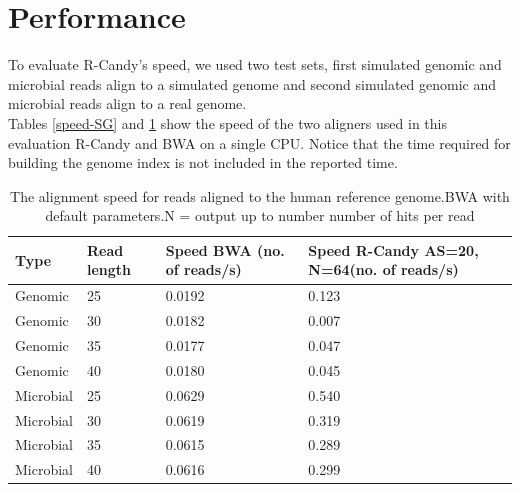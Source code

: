 \documentclass[11pt,a4paper]{report}
\begin{document}





\section{Performance}

To evaluate R-Candy's speed, we used two test sets, first simulated genomic 
and microbial reads align to a simulated genome and second simulated genomic
and microbial reads align to a real genome.\\

Tables  \ref{speed-SG} and \ref{speed-RG} show the speed of 
the two aligners used in this evaluation
R-Candy and BWA on a single CPU.
Notice that the time required for building the genome index is 
not included in the reported time.\\




\begin{table}[H]
  \begin{tabular}{ |  p{2cm} | p{2cm} | p{3cm} | p{3cm} | }
    \hline
  	\textbf{Type} & \textbf{Read length }&\textbf{Speed BWA \hspace{35pt}(no. of reads/s) } 	 
  	& \textbf{Speed R-Candy AS=20, N=64\hspace{35pt}(no. of reads/s)}\\ \hline
  	  
 	  Genomic    & 25  & 0.0192 &   0.123 \\ \hline
      Genomic    & 30  & 0.0182 &   0.007 \\ \hline
      Genomic    & 35  & 0.0177 &   0.047 \\ \hline
 	  Genomic	 & 40  & 0.0180 &   0.045 \\ \hline
 	  Microbial  & 25  & 0.0629 &   0.540 \\ \hline
      Microbial  & 30  & 0.0619 &   0.319 \\ \hline
 	  Microbial  & 35  & 0.0615 &   0.289 \\ \hline
 	  Microbial  & 40  & 0.0616 &   0.299 \\ \hline
 	  
   \end{tabular}
\caption{The alignment speed for reads aligned to the human reference genome.BWA with default parameters.N = output up to number number of hits per read }
\label{speed-RG}
\end{table}
\end{document}
